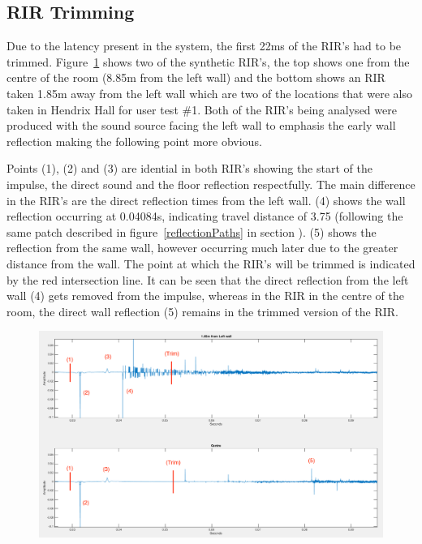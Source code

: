 \documentclass[../../main.tex]{subfiles}
\begin{document}
	\subsection{RIR Trimming}
		Due to the latency present in the system, the first 22ms of the \ac{RIR}'s had to be trimmed. Figure~\ref{odeonTrim} shows two of the synthetic \ac{RIR}'s, the top shows one from the centre of the room (8.85m from the left wall) and the bottom shows an \ac{RIR} taken 1.85m away from the left wall which are two of the locations that were also taken in Hendrix Hall for user test \#1. Both of the \ac{RIR}'s being analysed were produced with the sound source facing the left wall to emphasis the early wall reflection making the following point more obvious. 

		Points (1), (2) and (3) are idential in both \ac{RIR}'s showing the start of the impulse, the direct sound and the floor reflection respectfully. The main difference in the \ac{RIR}'s are the direct reflection times from the left wall. (4) shows the wall reflection occurring at 0.04084s, indicating travel distance of 3.75 (following the same patch described in figure~\ref{reflectionPaths} in section ). (5) shows the reflection from the same wall, however occurring much later due to the greater distance from the wall. The point at which the \ac{RIR}'s will be trimmed is indicated by the red intersection line. It can be seen that the direct reflection from the left wall (4) gets removed from the impulse, whereas in the \ac{RIR} in the centre of the room, the direct wall reflection (5) remains in the trimmed version of the \ac{RIR}.

		\begin{figure}[H]
			\centerline{\includegraphics[scale = 0.4]{Sections/Implementation/Max/images/Latency/odeonLatency_edit.png}}
			\caption{}
			\label{odeonTrim}
		\end{figure}
\end{document}
